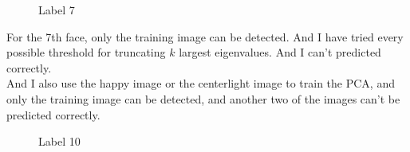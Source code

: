 \documentclass[letterpaper]{polythesis}
\begin{document}
\begin{figure}[htbp]
  \centering
  \caption{Label 7}
  \label{fig:result 7.3} %
\end{figure}

For the 7th face, only the training image can be detected. And I have tried
every possible threshold for truncating $k$ largest eigenvalues. And I can't
predicted correctly. \\
And I also use the happy image or the centerlight image to train
the PCA, and only the training image can be detected, and another two of the images
can't be predicted correctly.

\newpage

\begin{figure}[htbp]
  \centering
  \caption{Label 10}
  \label{fig:result 10.1} %
\end{figure}
\end{document}
